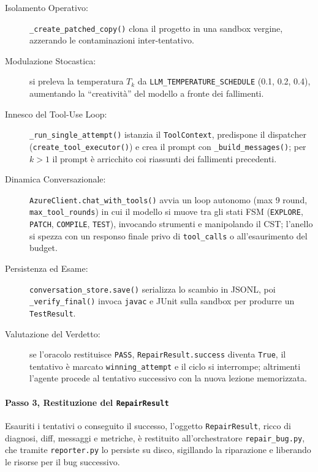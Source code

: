 \begin{description}
    \item[Isolamento Operativo:] \texttt{\_create\_patched\_copy()} clona il progetto in una sandbox vergine,
    azzerando le contaminazioni inter-tentativo.
    \item[Modulazione Stocastica:] si preleva la temperatura $T_k$ da \texttt{LLM\_TEMPERATURE\_SCHEDULE}
    (0.1, 0.2, 0.4), aumentando la ``creatività'' del modello a fronte dei fallimenti.
    \item[Innesco del Tool-Use Loop:] \texttt{\_run\_single\_attempt()} istanzia il \texttt{ToolContext}, predispone il
    dispatcher (\texttt{create\_tool\_executor()}) e crea il prompt con \texttt{\_build\_messages()}; per $k > 1$ il
    prompt è arricchito coi riassunti dei fallimenti precedenti.
    \item[Dinamica Conversazionale:] \texttt{AzureClient.chat\_with\_tools()} avvia un loop autonomo (max 9 round,
    \texttt{max\_tool\_rounds}) in cui il modello si muove tra gli stati FSM (\texttt{EXPLORE}, \texttt{PATCH},
    \texttt{COMPILE}, \texttt{TEST}), invocando strumenti e manipolando il CST; l'anello si spezza con un responso
    finale privo di \texttt{tool\_calls} o all'esaurimento del budget.
    \item[Persistenza ed Esame:] \texttt{conversation\_store.save()} serializza lo scambio in JSONL, poi
    \texttt{\_verify\_final()} invoca \texttt{javac} e JUnit sulla sandbox per produrre un \texttt{TestResult}.
    \item[Valutazione del Verdetto:] se l'oracolo restituisce \texttt{PASS}, \texttt{RepairResult.success} diventa
    \texttt{True}, il tentativo è marcato \texttt{winning\_attempt} e il ciclo si interrompe; altrimenti l'agente
    procede al tentativo successivo con la nuova lezione memorizzata.
\end{description}

\paragraph{Passo 3, Restituzione del \texttt{RepairResult}}
Esauriti i tentativi o conseguito il successo, l'oggetto \texttt{RepairResult}, ricco di diagnosi, diff, messaggi e
metriche, è restituito all'orchestratore \texttt{repair\_bug.py}, che tramite \texttt{reporter.py} lo persiste su disco,
sigillando la riparazione e liberando le risorse per il bug successivo.


